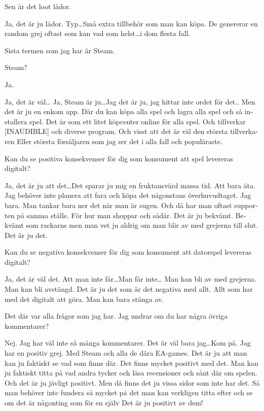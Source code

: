 \documentclass[11p]{article}
\begin{document}
\begin{otherlanguage}{swedish}
    \setlength{\leftskip}{0cm}
    Sen är det loot lådor.

    \setlength{\leftskip}{1cm}
    Ja, det är ju lådor. Typ\dots Små extra tillbehör som man kan köpa.
    De genererar en random grej oftast som kan vad som helst\dots i dom flesta fall.


    \setlength{\leftskip}{0cm}
    Sista termen som jag har är Steam.

    \setlength{\leftskip}{1cm}
    Steam?

    \setlength{\leftskip}{0cm}
    Ja.

    \setlength{\leftskip}{1cm}
    Ja, det är väl\dots
    Ja, Steam är ju\dots Jag det är ju, jag hittar inte ordet för det.. Men det är ju en enkom app. Där du kan köpa alla spel och lagra alla spel och så installera spel.
    Det är som ett litet köpcenter online för alla spel. Och tillverkar [INAUDIBLE] och diverse program. Och visst att det är väl den största tillverkaren
    Eller största försäljaren som jag ser det i alla fall och populäraste.


    \setlength{\leftskip}{0cm}
    Kan du se positiva konsekvenser för dig som konsument att spel levereras digitalt?

    \setlength{\leftskip}{1cm}
    Ja, det är ju att det\dots Det sparar ju mig en fruktansvärd massa tid.
    Att bara äta. Jag behöver inte planera att fara och köpa det någonstans överhuvudtaget. Jag bara. Man tankar bara ner det när man är sugen. Och då har man oftast supporten på samma ställe.
    För hur man shoppar och sådär. Det är ju bekvämt. Bekvämt som rackarns men man vet ju aldrig om man blir av med grejerna till slut. Det är ju det.


    \setlength{\leftskip}{0cm}
    Kan du se negativa konsekvenser för dig som konsument att datorspel levereras digitalt?

    \setlength{\leftskip}{1cm}
    Ja, det är väl det. Att man inte får\dots Man får inte\dots
    Man kan bli av med grejerna. Man kan bli avstängd. Det är ju det som är det negativa med allt. Allt som har med det digitalt att göra. Man kan bara stänga av.


    \setlength{\leftskip}{0cm}
    Det där var alla frågor som jag har.
    Jag undrar om du har några övriga kommentarer?


    \setlength{\leftskip}{1cm}
    Nej. Jag har väl inte så många kommentarer. Det är väl bara jag\dots Kom på.
    Jag har en positiv grej. Med Steam och alla de dära  EA-games. Det är ju att man kan ju faktiskt se vad som finns där.
    Det finns mycket positivt med det. Man kan ju faktiskt titta på vad andra tycker och läsa recensioner och sånt där om spelen.
    Och det är ju jävligt positivt. Men då finns det ju vissa sidor som inte har det. Så man behöver inte fundera så mycket på det man kan verkligen titta efter och se om det är någonting som för en själv
    Det är ju positivt av dem!



\end{otherlanguage}
\end{document}
